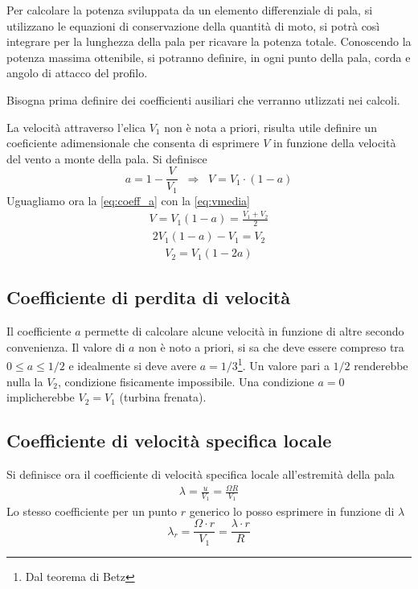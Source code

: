 Per calcolare la potenza sviluppata da un elemento differenziale di pala, si utilizzano le equazioni di conservazione della quantità di moto, si potrà così integrare per la lunghezza della pala per ricavare la potenza totale. Conoscendo la potenza massima ottenibile, si potranno definire, in ogni punto della pala, corda e angolo di attacco del profilo. 

Bisogna prima definire dei coefficienti ausiliari che verranno utlizzati nei calcoli. 

La velocità attraverso l'elica $V_1$ non è nota a priori, risulta utile definire un coeficiente adimensionale che consenta di esprimere $V$ in funzione della velocità del vento a monte della pala. Si definisce 
\begin{equation}\label{eq:coeff_a}
a = 1-\frac{V}{V_1} \;\; \Rightarrow \;\; V = V_1 \cdot \left(1-a \right)
\end{equation}
Uguagliamo ora la \ref{eq:coeff_a} con la \ref{eq:vmedia}
\begin{align*}
V = V_1 (1-a) = \frac{V_1 +V_2}{2}
\end{align*}
\begin{align*}
2 V_1 (1-a) - V_1 = V_2
\end{align*}
\begin{align*}
V_2 = V_1 (1-2a)
\end{align*}
\subsection{Coefficiente di perdita di velocità}
Il coefficiente $a$ permette di calcolare alcune velocità in funzione di altre secondo convenienza. Il valore di $a$ non è noto a priori, si sa che deve essere compreso tra $0 \leq a \leq 1/2$ e idealmente si deve avere $a = 1/3$\footnote{Dal teorema di Betz}. Un valore pari a $1/2$ renderebbe nulla la $V_2$, condizione fisicamente impossibile. Una condizione $a=0$ implicherebbe $V_2 = V_1$ (turbina frenata). 
\subsection{Coefficiente di velocità specifica locale}
Si definisce ora il coefficiente di velocità specifica locale all'estremità della pala 
\begin{align*}
\lambda = \frac{u}{V_1} = \frac{\Omega R}{V_1} 
\end{align*}
Lo stesso coefficiente per un punto $r$ generico lo posso esprimere in funzione di $\lambda$
\begin{equation}\label{eq:deflambdar}
\lambda_r = \frac{\Omega \cdot r}{V_1} = \frac{\lambda \cdot r}{R} 
\end{equation}
